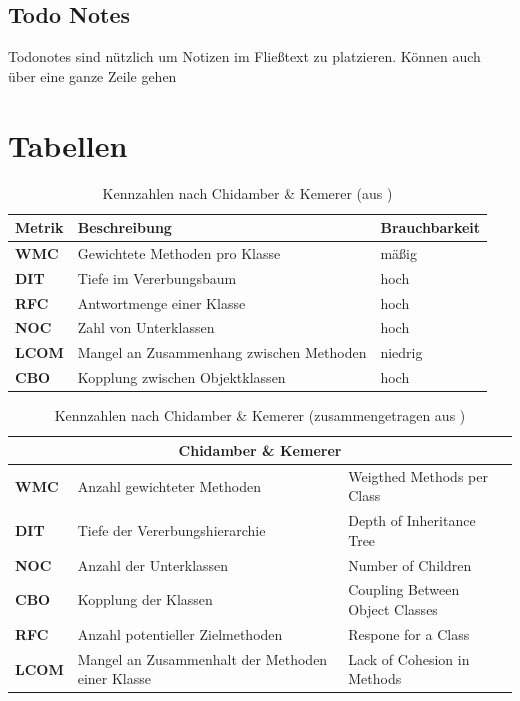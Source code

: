 \subsection{Todo Notes}
 Todonotes sind nützlich um Notizen im Fließtext zu platzieren. Können auch über eine ganze Zeile gehen

\section{Tabellen}
\blindtext
\begin{table}[h]
	\centering
	\begin{tabular}{|l|l|l|}
\hline 
		Metrik 		  &Beschreibung 								&  Brauchbarkeit\\ 
\hline  
		\textbf{WMC}  &Gewichtete Methoden pro Klasse 				&  mäßig 		\\ 
\hline  
		\textbf{DIT}  &Tiefe im Vererbungsbaum 						&  hoch 		\\ 
\hline  
		\textbf{RFC}  &Antwortmenge einer Klasse 					&  hoch 		\\ 
\hline 
		\textbf{NOC}  &Zahl von Unterklassen 						&  hoch 		\\ 
\hline  
		\textbf{LCOM} &Mangel an Zusammenhang zwischen Methoden 	&  niedrig  	\\ 
\hline  
		\textbf{CBO}  &Kopplung zwischen Objektklassen 				&  hoch  		\\ 
\hline 
	\end{tabular} 
	\caption{Kennzahlen nach Chidamber \& Kemerer (aus \cite{Prech1999})}
	\label{tab:metrik}
\end{table}


\begin{table}[h]
	\centering
	\begin{tabular}{lp{6cm}p{6cm}}
		\toprule
		\multicolumn{3}{c}{Chidamber \& Kemerer}\\ 
		\midrule
		\textbf{WMC}  &Anzahl gewichteter Methoden 				&  Weigthed Methods per Class 		\\ 
		\textbf{DIT}  &Tiefe der Vererbungshierarchie  			&  Depth of Inheritance Tree 		\\ 
		\textbf{NOC}  &Anzahl der Unterklassen 					&  Number of Children 				\\ 
		\textbf{CBO}  &Kopplung der Klassen 					&  Coupling Between Object Classes 	\\  
		\textbf{RFC}  &Anzahl potentieller Zielmethoden 		&  Respone for a Class  			\\  
		\textbf{LCOM} &Mangel an Zusammenhalt der Methoden
		 				einer Klasse 							&  Lack of Cohesion in Methods  		\\ 
		\bottomrule
	\end{tabular} 
	\caption{Kennzahlen nach Chidamber \& Kemerer (zusammengetragen aus \cite{Prech1999,Sneed2010,Chidamber1994})}
	\label{tab:ck}
\end{table}




